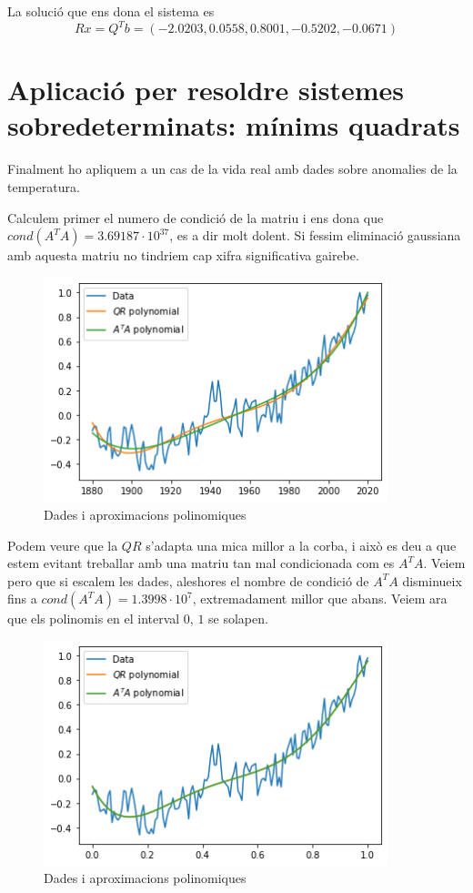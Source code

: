 \documentclass[12pt, a4papre]{article}
\begin{document}
	La solució que ens dona el sistema es 
	\[
		Rx = Q^Tb = (-2.0203, 0.0558, 0.8001, -0.5202, -0.0671)
	\]
	
	\section{Aplicació per resoldre sistemes sobredeterminats: mínims quadrats}
	
	Finalment ho apliquem a un cas de la vida real amb dades sobre anomalies de la temperatura.
	
	Calculem primer el numero de condició de la matriu i ens dona que $cond(A^TA) = 3.69187\cdot 10^{37}$, es a dir molt dolent. Si fessim eliminació gaussiana amb aquesta matriu no tindriem cap xifra significativa gairebe.
	
	\begin{figure}[H]
		\begin{center}
		\includegraphics[width=100mm]{pr3_1.png}
		\caption{Dades i aproximacions polinomiques}
		\end{center}
	\end{figure}
	
	Podem veure que la $QR$ s'adapta una mica millor a la corba, i això es deu a que estem evitant treballar amb una matriu tan mal condicionada com es $A^TA$. Veiem pero que si escalem les dades, aleshores el nombre de condició de $A^TA$ disminueix fins a $cond(A^TA) = 1.3998\cdot 10^{7}$, extremadament millor que abans. Veiem ara que els polinomis en el interval $0$, $1$ se solapen.
	
	\begin{figure}[H]
		\begin{center}
		\includegraphics[width=100mm]{pr3_2.png}
		\caption{Dades i aproximacions polinomiques}
		\end{center}
	\end{figure}
	
\end{document}
